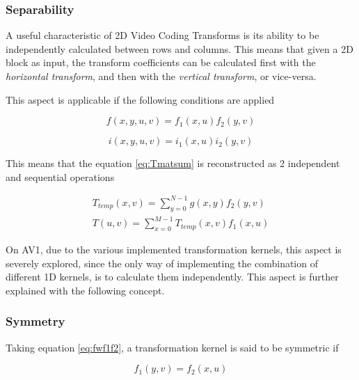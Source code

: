 
\subsubsection{Separability}

A useful characteristic of 2D Video Coding Transforms is its ability to be independently calculated between rows and columns. This means that given a 2D block as input, the transform coefficients can be calculated first with the \emph{horizontal transform}, and then with the \emph{vertical transform}, or vice-versa.

This aspect is applicable if the following conditions are applied

\begin{equation} \label{eq:fwf1f2}
    f(x,y,u,v)=f_1(x,u)f_2(y,v)
\end{equation}


\begin{equation} \label{eq:ini1i2}
    i(x,y,u,v)=i_1(x,u)i_2(y,v)
\end{equation}

This means that the equation \ref{eq:Tmatsum} is reconstructed as 2 independent and sequential operations

\begin{gather}
    T_{temp}(x,v) = \sum_{y=0}^{N-1}g(x,y)f_2(y,v) \\
    T(u,v) = \sum_{x=0}^{M-1}T_{temp}(x,v)f_1(x,u)
\end{gather}

On AV1, due to the various implemented transformation kernels, this aspect is severely explored, since the only way of implementing the combination of different 1D kernels, is to calculate them independently. This aspect is further explained with the following concept.

\subsubsection{Symmetry}

Taking equation \ref{eq:fwf1f2}, a transformation kernel is said to be symmetric if 

\begin{equation}
    f_1(y,v) = f_2(x,u)
\end{equation}

